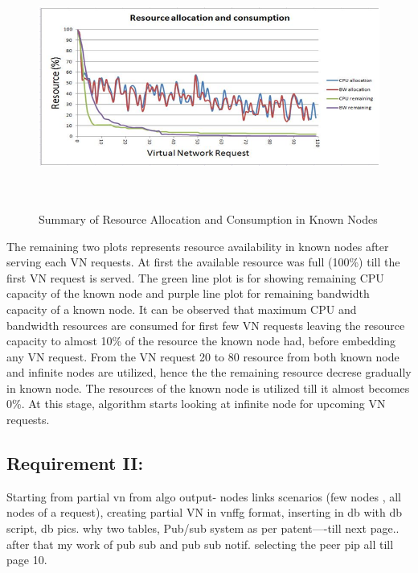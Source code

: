 \documentclass[article,dr=phil,type=msc ,colorback,accentcolor=tud4b]{tudthesis}
\begin{document}
\begin{figure}[h]
	\centering
	\includegraphics[width=15cm, height=8cm]{RES_CON_PE.png}
	\caption{Summary of Resource Allocation and Consumption in Known Nodes}
	\label{resr_consumption}
\end{figure}
The remaining two plots represents resource availability in known nodes after serving each VN requests. At first the available resource was full (100\%) till the first VN request is served. The green line plot is for showing remaining CPU capacity of the known node and purple line plot for remaining bandwidth capacity of a known node. It can be observed that maximum CPU and bandwidth resources are consumed for first few VN requests leaving the resource capacity to almost 10\% of the resource the known node had, before embedding any VN request. From the VN request 20 to 80 resource from both known node and infinite nodes are utilized, hence the the remaining resource decrese gradually in known node. The resources of the known node is utilized till it almost becomes 0\%. At this stage, algorithm starts looking at infinite node for upcoming VN requests. 
\newpage
\subsection{Requirement II: }

Starting from partial vn from algo output- nodes links scenarios (few nodes , all nodes of a request), creating partial VN in vnffg format, inserting in db with db script, db pics. why two tables, 
Pub/sub system as per patent----till next page..
after that my work of pub sub and pub sub notif. selecting the peer pip all till page 10.



 
\newpage
 

\end{document}
